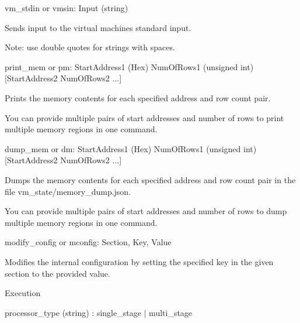 \begin{DoxyItemize}
\item {\ttfamily vm\+\_\+stdin} or {\ttfamily vmsin}\+: {\ttfamily Input} (string)
\begin{DoxyItemize}
\item Sends input to the virtual machine\textquotesingle{}s standard input.
\item Note\+: use double quotes for strings with spaces.
\end{DoxyItemize}
\item {\ttfamily print\+\_\+mem} or {\ttfamily pm}\+: {\ttfamily Start\+Address1} (Hex) {\ttfamily Num\+Of\+Rows1} (unsigned int) \mbox{[}{\ttfamily Start\+Address2} {\ttfamily Num\+Of\+Rows2} ...\mbox{]}
\begin{DoxyItemize}
\item Prints the memory contents for each specified address and row count pair.
\item You can provide multiple pairs of start addresses and number of rows to print multiple memory regions in one command.
\end{DoxyItemize}
\item {\ttfamily dump\+\_\+mem} or {\ttfamily dm}\+: {\ttfamily Start\+Address1} (Hex) {\ttfamily Num\+Of\+Rows1} (unsigned int) \mbox{[}{\ttfamily Start\+Address2} {\ttfamily Num\+Of\+Rows2} ...\mbox{]}
\begin{DoxyItemize}
\item Dumps the memory contents for each specified address and row count pair in the file {\ttfamily vm\+\_\+state/memory\+\_\+dump.\+json}.
\item You can provide multiple pairs of start addresses and number of rows to dump multiple memory regions in one command.
\end{DoxyItemize}
\item {\ttfamily modify\+\_\+config} or {\ttfamily mconfig}\+: {\ttfamily Section}, {\ttfamily Key}, {\ttfamily Value}
\begin{DoxyItemize}
\item Modifies the internal configuration by setting the specified key in the given section to the provided value.
\item {\ttfamily Execution}
\begin{DoxyItemize}
\item {\ttfamily processor\+\_\+type} (string) \+: {\ttfamily single\+\_\+stage} $\vert$ {\ttfamily multi\+\_\+stage} ~\newline


\end{DoxyItemize}
\end{DoxyItemize}
\end{DoxyItemize}
